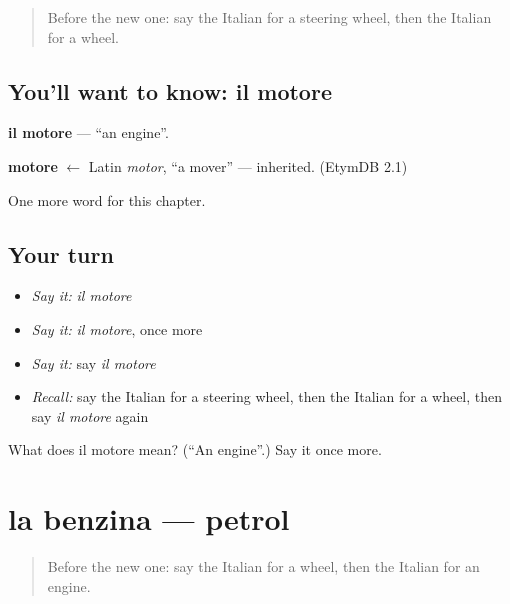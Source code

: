 \label{lesson:IT-C254-motore}



\begin{quote}
Before the new one: say the Italian for a steering wheel, then the Italian for a wheel.
\end{quote}

\subsection*{You'll want to know: il motore}
\textbf{il motore} — \textquotedblleft{}an engine\textquotedblright{}.

\begin{cousinweb}
\textbf{motore} $\leftarrow$ Latin \emph{motor}, \textquotedblleft{}a mover\textquotedblright{} — inherited. (EtymDB 2.1)
\end{cousinweb}

\begin{grammarlens}[title={What you've built}]
One more word for this chapter.
\end{grammarlens}

\subsection*{Your turn}
\begin{itemize}
\raggedright
  \item \emph{Say it:} \emph{il motore}
  \item \emph{Say it:} \emph{il motore}, once more
  \item \emph{Say it:} say \emph{il motore}
  \item \emph{Recall:} say the Italian for a steering wheel, then the Italian for a wheel, then say \emph{il motore} again
\end{itemize}

\begin{tcolorbox}[breakable,colback=teal!4,colframe=teal!35!black,title={Before you move on}]
What does il motore mean? (\textquotedblleft{}An engine\textquotedblright{}.) Say it once more.
\end{tcolorbox}
\section[la benzina]{la benzina — petrol}

\label{lesson:IT-C254-benzina}



\begin{quote}
Before the new one: say the Italian for a wheel, then the Italian for an engine.
\end{quote}

